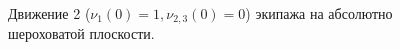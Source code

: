 \begin{figure}[htb]
    \caption{Движение 2 ($\nu_{1}(0) = 1, \nu_{2,3}(0) = 0$) экипажа на абсолютно шероховатой плоскости.}
    \label{fig:straight}
\end{figure}


